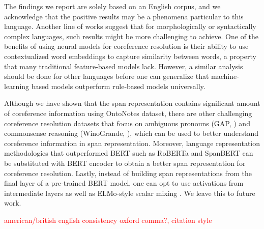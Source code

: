 \documentclass[11pt]{article}
\newcommand\todo[1]{\textcolor{red}{#1}}
\begin{document}

The findings we report are solely based on an English corpus, and we acknowledge that the positive results may be a phenomena particular to this language. Another line of works \parencite{russian,other-lang} suggest that for morphologically or syntactically complex languages, such results might be more challenging to achieve. One of the benefits of using neural models for coreference resolution is their ability to use contextualized word embeddings to capture similarity between words, a property that many traditional feature-based models lack. However, a similar analysis should be done for other languages before one can generalize that machine-learning based models outperform rule-based models universally.


Although we have shown that the span representation contains significant amount of coreference information using OntoNotes dataset, there are other challenging coreference resolution datasets that focus on ambiguous pronouns (GAP, \parencite{webster2018gap}) and commonsense reasoning (WinoGrande, \parencite{winogrande}), which can be used to better understand coreference information in span representation. Moreover, language representation methodologies that outperformed BERT such as RoBERTa \parencite{roberta} and SpanBERT \parencite{spanbert} can be substituted with BERT encoder to obtain a better span representation for coreference resolution. Lastly, instead of building span representations from the final layer of a pre-trained BERT model, one can opt to use activations from intermediate layers as well as ELMo-style scalar mixing \parencite{tenney2019context,peters2018elmo}. We leave this to future work.


 \todo{american/british english consistency} 
 \todo{oxford comma?, citation style }

\printbibliography
\end{document}
